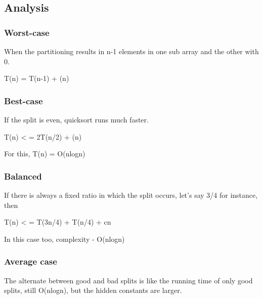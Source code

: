 \documentclass{article}
\begin{document}
\subsection{Analysis}
\subsubsection{Worst-case}
When the partitioning results in n-1 elements in one sub array and the other with 0.

T(n) = T(n-1) + \theta(n)

\subsubsection{Best-case}

If the split is even, quicksort runs much faster.

T(n) < = 2T(n/2) + \theta(n)

For this, T(n) = O(nlogn)

\subsubsection{Balanced}
If there is always a fixed ratio in which the split occurs, let's say 3/4 for instance, then

T(n) < = T(3n/4) + T(n/4) + cn

In this case too, complexity - O(nlogn)

\subsubsection{Average case}
The alternate between good and bad splits is like the running time of only good splits, still O(nlogn), but the hidden constants are larger.
\end{document}
